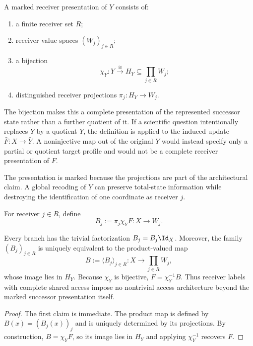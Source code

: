 \begin{definition}\label{def:marked-receiver-presentation}
A marked receiver presentation of $Y$ consists of:
\begin{enumerate}[label=(\roman*)]
\item a finite receiver set $R$;
\item receiver value spaces $(W_j)_{j\in R}$;
\item a bijection
\[
\chi_Y:Y\xrightarrow{\cong}H_Y\subseteq\prod_{j\in R}W_j;
\]
\item distinguished receiver projections $\pi_j:H_Y\to W_j$.
\end{enumerate}
\end{definition}

The bijection makes this a complete presentation of the represented successor state rather than a further quotient of it. If a scientific question intentionally replaces $Y$ by a quotient $\bar Y$, the definition is applied to the induced update $\bar F:X\to\bar Y$. A noninjective map out of the original $Y$ would instead specify only a partial or quotient target profile and would not be a complete receiver presentation of $F$.

The presentation is marked because the projections are part of the architectural claim. A global recoding of $Y$ can preserve total-state information while destroying the identification of one coordinate as receiver $j$.

\begin{definition}\label{def:receiver-branch}
For receiver $j\in R$, define
\[
B_j:=\pi_j\chi_YF:X\to W_j.
\]
\end{definition}

\begin{proposition}\label{prop:full-access-collapse}
Every branch has the trivial factorization $B_j=B_j\Id_X$. Moreover, the family $(B_j)_{j\in R}$ is uniquely equivalent to the product-valued map
\[
B:=\langle B_j\rangle_{j\in R}:X\to\prod_{j\in R}W_j,
\]
whose image lies in $H_Y$. Because $\chi_Y$ is bijective, $F=\chi_Y^{-1}B$. Thus receiver labels with complete shared access impose no nontrivial access architecture beyond the marked successor presentation itself.
\end{proposition}

\begin{proof}
The first claim is immediate. The product map is defined by $B(x)=(B_j(x))_j$ and is uniquely determined by its projections. By construction, $B=\chi_YF$, so its image lies in $H_Y$ and applying $\chi_Y^{-1}$ recovers $F$.
\end{proof}

